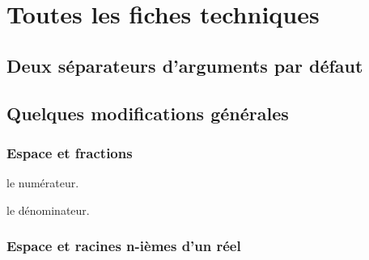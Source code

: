 \documentclass[12pt,a4paper]{article}
\theoremstyle{definition}
\newcommand\extraspace{
	\vspace{0.25em}
}
\begin{document}
{{{{{{{{{{{\begin{description}
\end{description}


\newpage
\section{Toutes les fiches techniques} \label{techincal-ids}















\subsection{Deux séparateurs d'arguments par défaut}









\subsection{Quelques modifications générales}

\subsubsection{Espace et fractions}





\extraspace




 le numérateur.

 le dénominateur.


\subsubsection{Espace et racines n-ièmes d'un réel}






}}}}}}}}}}}
\end{document}

